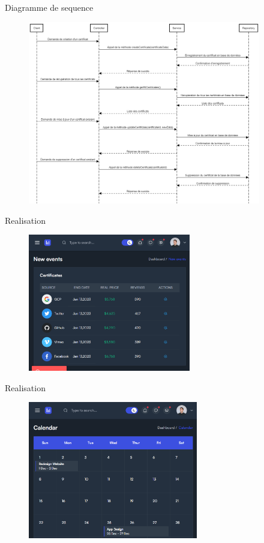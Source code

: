 \documentclass[aspectratio=169]{beamer}
\begin{document}
\begin{frame}{Diagramme de sequence}
    \begin{figure}[htpb]
        \centering
        \includegraphics[height=8cm]{assets/images/seq-certifs.png}
    \end{figure}
\end{frame}

\begin{frame}{Realisation}
    \begin{figure}[htpb]
        \centering
        \includegraphics[height=6cm]{assets/images/certifs-list.png}
    \end{figure}
\end{frame}

\begin{frame}{Realisation}
    \begin{figure}[htpb]
        \centering
        \includegraphics[height=6cm]{assets/images/calendar.png}
    \end{figure}
\end{frame}
\end{document}
